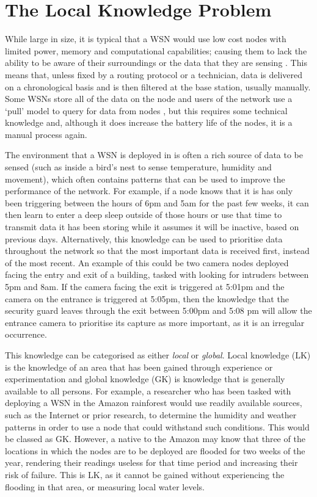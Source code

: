 \section{The Local Knowledge Problem}
While large in size, it is typical that a WSN would use low cost nodes with limited power, memory and computational capabilities; causing them to lack the ability to be aware of their surroundings or the data that they are sensing \cite{Akyildiz2002}. This means that, unless fixed by a routing protocol or a technician, data is delivered on a chronological basis and is then filtered at the base station, usually manually. Some WSNs store all of the data on the node and users of the network use a `pull' model to query for data from nodes \cite{Sadagopan}, but this requires some technical knowledge and, although it does increase the battery life of the nodes, it is a manual process again.

The environment that a WSN is deployed in is often a rich source of data to be sensed (such as inside a bird's nest to sense temperature, humidity and movement), which often contains patterns that can be used to improve the performance of the network. For example, if a node knows that it is has only been triggering between the hours of 6pm and 5am for the past few weeks, it can then learn to enter a deep sleep outside of those hours or use that time to transmit data it has been storing while it assumes it will be inactive, based on previous days. Alternatively, this knowledge can be used to prioritise data throughout the network so that the most important data is received first, instead of the most recent. An example of this could be two camera nodes deployed facing the entry and exit of a building, tasked with looking for intruders between 5pm and 8am. If the camera facing the exit is triggered at 5:01pm and the camera on the entrance is triggered at 5:05pm, then the knowledge that the security guard leaves through the exit between 5:00pm and 5:08 pm will allow the entrance camera to prioritise its capture as more important, as it is an irregular occurrence.

This knowledge can be categorised as either \textit{local} or \textit{global}. Local knowledge (LK)  is the knowledge of an area that has been gained through experience or experimentation \cite{Joshi2001} and global knowledge (GK) is knowledge that is generally available to all persons. For example, a researcher who has been tasked with deploying a WSN in the Amazon rainforest would use readily available sources, such as the Internet or prior research, to determine the humidity and weather patterns in order to use a node that could withstand such conditions. This would be classed as GK. However, a native to the Amazon may know that three of the locations in which the nodes are to be deployed are flooded for two weeks of the year, rendering their readings useless for that time period and increasing their risk of failure. This is LK, as it cannot be gained without experiencing the flooding in that area, or measuring local water levels.

